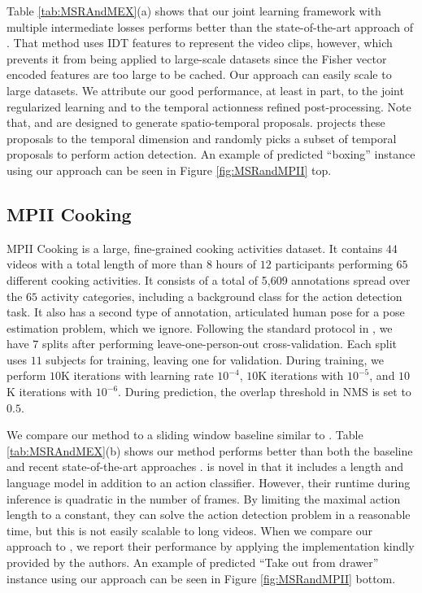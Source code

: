 \documentclass[10pt,twocolumn,letterpaper]{article}
\begin{document}
Table \ref{tab:MSRAndMEX}(a) shows that our joint learning framework with multiple intermediate losses performs better than the state-of-the-art approach of \cite{fast_temporal_action_proposal_fabian_cvpr16}. That method uses IDT features to represent the video clips, however, which prevents it from being applied to large-scale datasets since the Fisher vector encoded features are too large to be cached. Our approach can easily scale to large datasets. We attribute our good performance, at least in part, to the joint regularized learning and to the temporal actionness refined post-processing. Note that, \cite{yu_FAP_cvpr15} and \cite{APT_Gemert_bmvc15} are designed to generate spatio-temporal proposals. \cite{fast_temporal_action_proposal_fabian_cvpr16} projects these proposals to the temporal dimension and randomly picks a subset of temporal proposals to perform action detection. An example of predicted ``boxing'' instance using our approach can be seen in Figure \ref{fig:MSRandMPII} top.

\subsection{MPII Cooking}
MPII Cooking \cite{MPII_cooking_cvpr12} is a large, fine-grained cooking activities dataset. It contains $44$ videos with a total length of more than $8$ hours of $12$ participants performing $65$ different cooking activities. It consists of a total of 5,609 annotations spread over the $65$ activity categories, including a background class for the action detection task. It also has a second type of annotation, articulated human pose for a pose estimation problem, which we ignore. Following the standard protocol in \cite{MPII_cooking_cvpr12}, we have $7$ splits after performing leave-one-person-out cross-validation. Each split uses $11$ subjects for training, leaving one for validation. During training, we perform $10$K iterations with learning rate $10^{-4}$, $10$K iterations with $10^{-5}$, and $10$K iterations with $10^{-6}$. During prediction, the overlap threshold in NMS is set to $0.5$.

We compare our method to a sliding window baseline similar to \cite{action_detection_language_richard_cvpr16,MPII_cooking_cvpr12}.
Table \ref{tab:MSRAndMEX}(b) shows our method performs better than both the baseline and recent state-of-the-art approaches \cite{action_detection_language_richard_cvpr16,APT_Gemert_bmvc15}. \cite{action_detection_language_richard_cvpr16} is novel in that it includes a length and language model in addition to an action classifier. 
However, their runtime during inference is quadratic in the number of frames. By limiting the maximal action length to a constant, they can solve the action detection problem in a reasonable time, but this is not easily scalable to long videos. 
When we compare our approach to \cite{APT_Gemert_bmvc15}, we report their performance by applying the implementation kindly provided by the authors. An example of predicted ``Take out from drawer'' instance using our approach can be seen in Figure \ref{fig:MSRandMPII} bottom.
\end{document}
